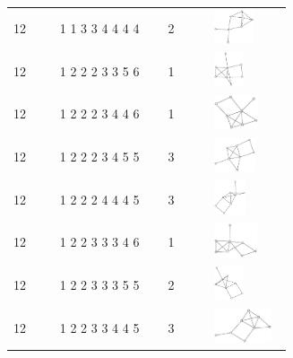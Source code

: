 \begin{table}[h!]
\begin{tabular}{m{0.15\linewidth} m{0.35\linewidth} m{0.15\linewidth} m{0.25\linewidth}}
12 & 1 1 3 3 4 4 4 4 & 2 & \includegraphics[height=1cm]{15-universal-graphs/img/degree-sequences-example-graphs/graph-4-8-15}\\
12 & 1 2 2 2 3 3 5 6 & 1 & \includegraphics[height=1cm]{15-universal-graphs/img/degree-sequences-example-graphs/graph-4-8-16}\\
12 & 1 2 2 2 3 4 4 6 & 1 & \includegraphics[height=1cm]{15-universal-graphs/img/degree-sequences-example-graphs/graph-4-8-17}\\
12 & 1 2 2 2 3 4 5 5 & 3 & \includegraphics[height=1cm]{15-universal-graphs/img/degree-sequences-example-graphs/graph-4-8-18}\\
12 & 1 2 2 2 4 4 4 5 & 3 & \includegraphics[height=1cm]{15-universal-graphs/img/degree-sequences-example-graphs/graph-4-8-19}\\
12 & 1 2 2 3 3 3 4 6 & 1 & \includegraphics[height=1cm]{15-universal-graphs/img/degree-sequences-example-graphs/graph-4-8-20}\\
12 & 1 2 2 3 3 3 5 5 & 2 & \includegraphics[height=1cm]{15-universal-graphs/img/degree-sequences-example-graphs/graph-4-8-21}\\
12 & 1 2 2 3 3 4 4 5 & 3 & \includegraphics[height=1cm]{15-universal-graphs/img/degree-sequences-example-graphs/graph-4-8-22}\\

\end{tabular}
\end{table}

